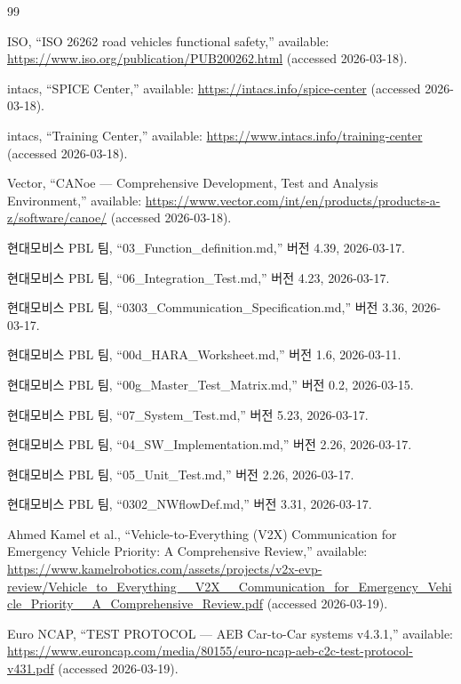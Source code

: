 \documentclass[10pt,a4paper,twocolumn]{article}
\begin{document}
\begin{thebibliography}{99}

ISO, ``ISO 26262 road vehicles functional safety,'' available: \url{https://www.iso.org/publication/PUB200262.html} (accessed 2026-03-18).

intacs, ``SPICE Center,'' available: \url{https://intacs.info/spice-center} (accessed 2026-03-18).

intacs, ``Training Center,'' available: \url{https://www.intacs.info/training-center} (accessed 2026-03-18).

Vector, ``CANoe --- Comprehensive Development, Test and Analysis Environment,'' available: \url{https://www.vector.com/int/en/products/products-a-z/software/canoe/} (accessed 2026-03-18).

현대모비스 PBL 팀, ``03\_Function\_definition.md,'' 버전 4.39, 2026-03-17.

현대모비스 PBL 팀, ``06\_Integration\_Test.md,'' 버전 4.23, 2026-03-17.

현대모비스 PBL 팀, ``0303\_Communication\_Specification.md,'' 버전 3.36, 2026-03-17.

현대모비스 PBL 팀, ``00d\_HARA\_Worksheet.md,'' 버전 1.6, 2026-03-11.

현대모비스 PBL 팀, ``00g\_Master\_Test\_Matrix.md,'' 버전 0.2, 2026-03-15.

현대모비스 PBL 팀, ``07\_System\_Test.md,'' 버전 5.23, 2026-03-17.

현대모비스 PBL 팀, ``04\_SW\_Implementation.md,'' 버전 2.26, 2026-03-17.

현대모비스 PBL 팀, ``05\_Unit\_Test.md,'' 버전 2.26, 2026-03-17.

현대모비스 PBL 팀, ``0302\_NWflowDef.md,'' 버전 3.31, 2026-03-17.

Ahmed Kamel et al., ``Vehicle-to-Everything (V2X) Communication for Emergency Vehicle Priority: A Comprehensive Review,'' available: \url{https://www.kamelrobotics.com/assets/projects/v2x-evp-review/Vehicle_to_Everything__V2X__Communication_for_Emergency_Vehicle_Priority__A_Comprehensive_Review.pdf} (accessed 2026-03-19).

Euro NCAP, ``TEST PROTOCOL --- AEB Car-to-Car systems v4.3.1,'' available: \url{https://www.euroncap.com/media/80155/euro-ncap-aeb-c2c-test-protocol-v431.pdf} (accessed 2026-03-19).


\end{thebibliography}
\end{document}
